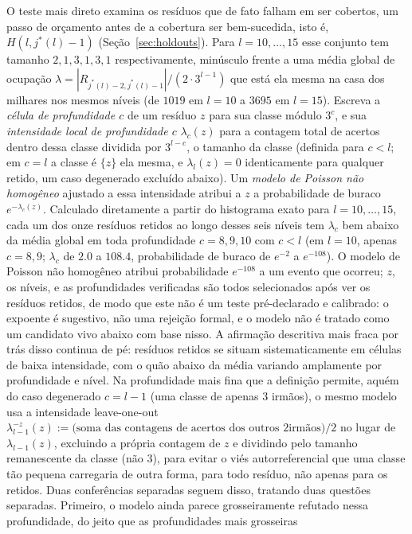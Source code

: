 \documentclass[11pt]{amsart}
\theoremstyle{plain}
\theoremstyle{definition}
\theoremstyle{remark}
\begin{document}
O teste mais direto examina os resíduos que de fato falham em ser cobertos, um passo de orçamento
antes de a cobertura ser bem-sucedida, isto é, $H(l,j^*(l)-1)$ (Seção~\ref{sec:holdouts}). Para
$l=10,\dots,15$ esse conjunto tem tamanho $2,1,3,1,3,1$ respectivamente, minúsculo frente a uma
média global de ocupação $\lambda=|R_{j^*(l)-2,j^*(l)-1}|/(2\cdot3^{l-1})$ que está ela mesma na
casa dos milhares nos mesmos níveis (de $1019$ em $l=10$ a $3695$ em $l=15$). Escreva a
\emph{célula de profundidade $c$} de um resíduo $z$ para sua classe módulo $3^c$, e sua
\emph{intensidade local de profundidade $c$} $\lambda_c(z)$ para a contagem total de acertos dentro
dessa classe dividida por $3^{l-c}$, o tamanho da classe (definida para $c<l$; em $c=l$ a classe é
$\{z\}$ ela mesma, e $\lambda_l(z)=0$ identicamente para qualquer retido, um caso degenerado
excluído abaixo). Um \emph{modelo de Poisson não homogêneo} ajustado a essa intensidade atribui a
$z$ a probabilidade de buraco $e^{-\lambda_c(z)}$. Calculado diretamente a partir do histograma
exato para $l=10,\dots,15$, cada um dos onze resíduos retidos ao longo desses seis níveis tem
$\lambda_c$ bem abaixo da média global em toda profundidade $c=8,9,10$ com $c<l$ (em $l=10$,
apenas $c=8,9$; $\lambda_c$ de $2.0$ a $108.4$, probabilidade de buraco de $e^{-2}$ a $e^{-108}$).
O modelo de Poisson não homogêneo atribui probabilidade $e^{-108}$ a um evento que ocorreu; $z$, os
níveis, e as profundidades verificadas são todos selecionados após ver os resíduos retidos, de modo
que este não é um teste pré-declarado e calibrado: o expoente é sugestivo, não uma rejeição formal,
e o modelo não é tratado como um candidato vivo abaixo com base nisso. A afirmação descritiva mais
fraca por trás disso continua de pé: resíduos retidos se situam sistematicamente em células de
baixa intensidade, com o quão abaixo da média variando amplamente por profundidade e nível. Na
profundidade mais fina que a definição permite, aquém do caso degenerado $c=l-1$ (uma classe de
apenas $3$ irmãos), o mesmo modelo usa a intensidade leave-one-out
$\lambda_{l-1}^{-z}(z):=\bigl(\text{soma das contagens de acertos dos outros $2$
irmãos}\bigr)/2$ no lugar de $\lambda_{l-1}(z)$, excluindo a própria contagem de $z$ e dividindo
pelo tamanho remanescente da classe (não $3$), para evitar o viés autorreferencial que uma classe
tão pequena carregaria de outra forma, para todo resíduo, não apenas para os retidos. Duas
conferências separadas seguem disso, tratando duas questões separadas. Primeiro, o modelo ainda
parece grosseiramente refutado nessa profundidade, do jeito que as profundidades mais grosseiras
\end{document}

